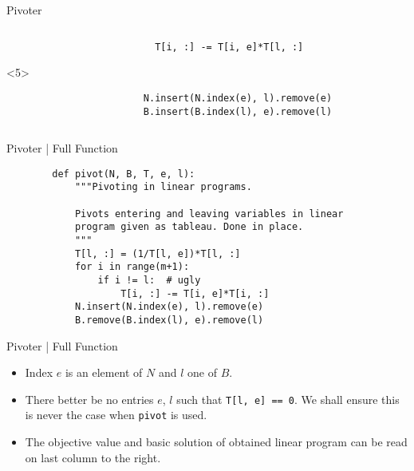 \documentclass[aspectratio = 169]{beamer}
\begin{document}
\begin{frame}[fragile]{Pivoter}
\begin{columns}
\begin{column}{.5\textwidth}
\begin{overlayarea}{.96\textwidth}{.45\textheight}
\begin{onlyenv}
\begin{tcolorbox}
{\begin{verbatim}
                          T[i, :] -= T[i, e]*T[l, :]
                      \end{verbatim}
                    }
                \end{tcolorbox}
            \end{onlyenv}
            \begin{onlyenv}<5>
                \begin{tcolorbox}[
                    enhanced,
                    parbox = false,
                    colback = mLightBrown!10!white,
                    colframe = mLightBrown,
                    arc = 0mm,
                    ]
                    \small{
                      \begin{verbatim}
                        N.insert(N.index(e), l).remove(e)
                        B.insert(B.index(l), e).remove(l)
                      \end{verbatim}
                    }
            \end{tcolorbox}
            \end{onlyenv}
        \end{overlayarea}
        \end{column}
    \end{columns}
\end{frame}

\begin{frame}[fragile]{Pivoter | Full Function}
     \small{
      \begin{verbatim}
        def pivot(N, B, T, e, l):
            """Pivoting in linear programs.

            Pivots entering and leaving variables in linear
            program given as tableau. Done in place.
            """
            T[l, :] = (1/T[l, e])*T[l, :]
            for i in range(m+1):
                if i != l:  # ugly
                    T[i, :] -= T[i, e]*T[i, :]
            N.insert(N.index(e), l).remove(e)
            B.remove(B.index(l), e).remove(l)
      \end{verbatim}
    }
\end{frame}

\begin{frame}{Pivoter | Full Function}
  \begin{itemize}
  \item<1->
    Index $e$ is an element of $N$ and $l$ one of $B$.
  \item<2->
    There better be no entries $e$, $l$ such that
    \texttt{T[l, e] == 0}. We shall ensure this is never
    the case when \texttt{pivot} is used.
  \item<3->
    The objective value and basic solution of obtained linear program
    can be read on last column to the right.
  \end{itemize}
\end{frame}
\end{document}
